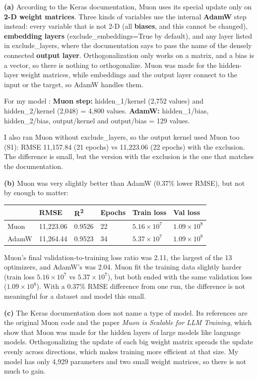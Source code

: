 \documentclass[12pt,a4paper]{article}
\begin{document}
\begin{answerbox}
\textbf{(a)} According to the Keras documentation, Muon uses its special update only on \textbf{2-D weight matrices}. Three kinds of variables use the internal \textbf{AdamW} step instead: every variable that is not 2-D (all \textbf{biases}, and this cannot be changed), \textbf{embedding layers} (exclude\_embeddings=True by default), and any layer listed in exclude\_layers, where the documentation says to pass the name of the densely connected \textbf{output layer}. Orthogonalization only works on a matrix, and a bias is a vector, so there is nothing to orthogonalize. Muon was made for the hidden-layer weight matrices, while embeddings and the output layer connect to the input or the target, so AdamW handles them.

For my model : \textbf{Muon step:} hidden\_1/kernel (2,752 values) and hidden\_2/kernel (2,048) = 4,800 values. \textbf{AdamW:} hidden\_1/bias, hidden\_2/bias, output/kernel and output/bias = 129 values.

I also ran Muon without exclude\_layers, so the output kernel used Muon too (S1): RMSE 11,157.84 (21 epochs) vs 11,223.06 (22 epochs) with the exclusion. The difference is small, but the version with the exclusion is the one that matches the documentation.

\textbf{(b)} Muon was very slightly better than AdamW (0.37\% lower RMSE), but not by enough to matter:

\begin{center}\small
\begin{tabular}{@{}llllll@{}}
\toprule
& RMSE & R\textsuperscript{2} & Epochs & Train loss & Val loss \\
\midrule
Muon & 11,223.06 & 0.9526 & 22 & \(5.16\times10^7\) & \(1.09\times10^8\) \\
AdamW & 11,264.44 & 0.9523 & 34 & \(5.37\times10^7\) & \(1.09\times10^8\) \\
\bottomrule
\end{tabular}
\end{center}

Muon's final validation-to-training loss ratio was 2.11, the largest of the 13 optimizers, and AdamW's was 2.04. Muon fit the training data slightly harder (train loss \(5.16\times10^7\) vs \(5.37\times10^7\)), but both ended with the same validation loss (\(1.09\times10^8\)). With a 0.37\% RMSE difference from one run, the difference is not meaningful for a dataset and model this small.

\textbf{(c)} The Keras documentation does not name a type of model. Its references are the original Muon code and the paper \emph{Muon is Scalable for LLM Training}, which show that Muon was made for the hidden layers of large models like language models. Orthogonalizing the update of each big weight matrix spreads the update evenly across directions, which makes training more efficient at that size. My model has only 4,929 parameters and two small weight matrices, so there is not much to gain.


\end{answerbox}
\end{document}
